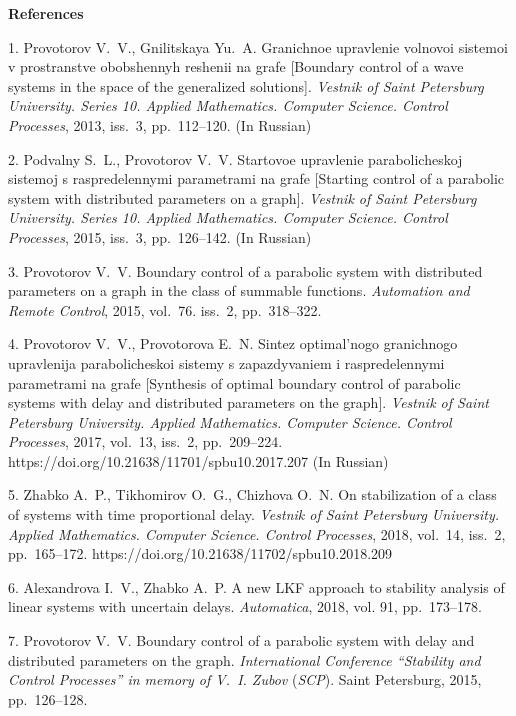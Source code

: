 

{\small



\vskip6mm

\noindent \textbf{References} }

\vskip 2mm

{\footnotesize

1. Provotorov V.~V.,  Gnilitskaya Yu.~A. Granichnoe upravlenie
volnovoi sistemoi v prostranstve obobshennyh reshenii na grafe
[Boundary control of a wave systems in the space of the
generalized solutions]. \textit{Vestnik of Saint Petersburg
University. Series 10. Applied Mathematics. Computer Science.
Control Processes}, 2013, iss.~3, pp.~112--120. (In Russian)

2. Podvalny S.~L., Provotorov V.~V. Startovoe upravlenie
parabolicheskoj sistemoj s raspredelennymi parametrami na grafe
[Starting control of a parabolic system with distributed
parameters on a graph]. \textit{Vestnik of Saint Petersburg
University. Series 10. Applied Mathematics. Computer Science.
Control Processes}, 2015, iss.~3, pp.~126--142. (In Russian)

3. Provotorov V.~V. Boundary control of a parabolic system with
distributed parameters on a graph in the class of summable
functions. \emph{Automation and Remote Control}, 2015, vol.~76.
iss.~2, pp.~318--322.

4. Provotorov V.~V., Provotorova E.~N. Sintez optimal'nogo
granichnogo upravlenija parabolicheskoi sistemy s zapazdyvaniem i
raspredelennymi parametrami na grafe [Synthesis of optimal
boundary control of parabolic systems with delay and distributed
parameters on the graph]. \textit{Vestnik of Saint Petersburg
University. Applied Mathematics. Computer Science. Control
Processes}, 2017, vol.~13, iss.~2, pp.~209--224.
https://doi.org/10.21638/11701/spbu10.2017.207 (In Russian)

5. Zhabko A.~P., Tikhomirov O.~G., Chizhova O.~N. On stabilization
of a class of systems with time proportional delay.
\textit{Vestnik of Saint Petersburg University. Applied
Mathematics. Computer Science. Control Processes}, 2018, vol.~14,
iss.~2, pp.~165--172.
https://doi.org/10.21638/11702/spbu10.2018.209

6. Alexandrova I.~V., Zhabko A.~P.  A new LKF approach to
stability analysis of linear systems with uncertain delays.
\emph{Automatica}, 2018, vol. 91, pp.~173--178.

7. Provotorov V.~V. Boundary control of a parabolic system with
delay and distributed parameters on the graph. \emph{International
Conference ``Stability and Control Processes'' in memory of V.~I.
Zubov} (\emph{SCP}). Saint Petersburg, 2015, pp.~126--128.

}
